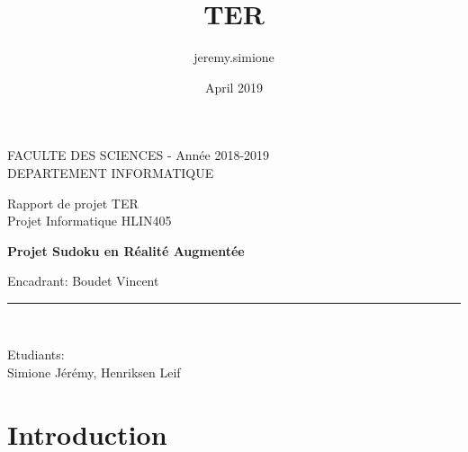 \documentclass{article}
\title{TER}
\author{jeremy.simione }
\date{April 2019}
\begin{document}
\begin{titlepage}

\begin{center}
\vspace*{-1in}
\begin{figure}[htb]
\begin{center}
\end{center}
\end{figure}

FACULTE DES SCIENCES - Année 2018-2019\\
\vspace*{0.15in}
DEPARTEMENT INFORMATIQUE \\
\vspace*{0.4in}
\begin{large}
Rapport de projet TER \\
Projet Informatique HLIN405\\
\end{large}
\vspace*{0.2in}
\begin{Large}
\textbf{Projet Sudoku en Réalité Augmentée} \\
\end{Large}
\vspace*{0.3in}
\begin{large}
Encadrant:
Boudet Vincent
 \\
\end{large}
\vspace*{0.3in}
\rule{80mm}{0.1mm}\\
\vspace*{0.1in}
\begin{large}
Etudiants: \\
Simione Jérémy, Henriksen Leif \\
 
\end{large}
\end{center}
\end{titlepage}

\newcommand{\CC}{C\nolinebreak\hspace{-.05em}\raisebox{.4ex}{\tiny\bf +}\nolinebreak\hspace{-.10em}\raisebox{.4ex}{\tiny\bf +}}
\def\CC{{C\nolinebreak[4]\hspace{-.05em}\raisebox{.4ex}{\tiny\bf ++}}}

\tableofcontents
\newpage

\section{Introduction}
\end{document}
